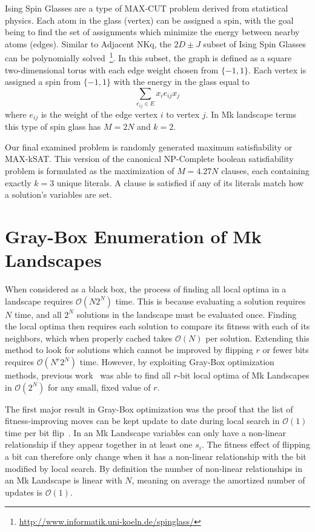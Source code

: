 \documentclass[runningheads,a4paper]{llncs}
\newcommand{\BigO}[1]{$\mathcal{O}{(#1)}$}
\begin{document}
Ising Spin Glasses are a type of MAX-CUT problem derived from statistical physics.
Each atom in the glass (vertex) can be assigned a spin, with the goal being to
find the set of assignments which minimize the energy between nearby atoms (edges).
Similar to Adjacent NKq, the $2D\pm J$ subset of Ising Spin Glasses can be polynomially
solved~\cite{saul:1994:spinglass}\footnote{\url{http://www.informatik.uni-koeln.de/spinglass/}}.
In this subset, the graph is defined as a square two-dimensional torus with each edge
weight chosen from $\{-1, 1\}$. Each vertex is assigned a spin from $\{-1, 1\}$ with
the energy in the glass equal to
\begin{equation}
\sum_{e_{ij} \in E} x_ie_{ij}x_j
  \label{eq-ising}
\end{equation}
where $e_{ij}$ is the weight of the edge vertex $i$ to vertex $j$. In Mk landscape terms
this type of spin glass has $M=2N$ and $k=2$.

Our final examined problem is randomly generated maximum satisfiability or MAX-kSAT.
This version of the canonical NP-Complete boolean satisfiability problem is formulated
as the maximization of $M=4.27N$ clauses, each containing exactly $k=3$ unique literals.
A clause is satisfied if any of its literals match how a solution's variables are set.

\section{Gray-Box Enumeration of Mk Landscapes}
When considered as a black box, the process of finding all local optima
in a landscape requires \BigO{N2^N} time. This is because evaluating
a solution requires $N$ time, and all $2^N$ solutions in the landscape
must be evaluated once. Finding the local
optima then requires each solution to compare its fitness with each
of its neighbors, which when properly cached takes \BigO{N} per solution.
Extending this method to look for solutions which cannot be improved by
flipping $r$ or fewer bits requires \BigO{N^r2^N} time. However,
by exploiting Gray-Box optimization methods, previous work~\cite{ochoa:2015:crossovernetworks}
was able to find all $r$-bit local optima of Mk Landscapes in \BigO{2^N} for any small,
fixed value of $r$.

The first major result in Gray-Box optimization was the proof that the list
of fitness-improving moves can be kept update to date during local search in \BigO{1}
time per bit flip~\cite{whitley:2012:constant}. In an Mk Landscape variables
can only have a non-linear relationship if they appear together in at least one $s_i$.
The fitness effect of flipping a bit can therefore only change when it has a non-linear
relationship with the bit modified by local search. By definition the number of non-linear
relationships in an Mk Landscape is linear with $N$, meaning on average the amortized
number of updates is \BigO{1}.
\end{document}
